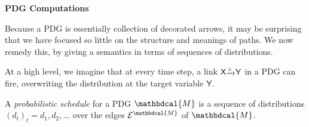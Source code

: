 \documentclass{article}
\theoremstyle{definition}
\theoremstyle{remark}
\newcommand{\Ed}{\mathcal E}
\newcommand{\ed}[3]{\var{#2}
	\overset{\smash{\mskip-5mu\raisebox{-3pt}{$\scriptscriptstyle
				#1$}}}{\raisebox{-1pt}{$\xrightarrow{\hphantom{\scriptscriptstyle#1}}$}} \var{#3}}
\newcommand{\dg}[1]{\mathbdcal{#1}}
\newcommand{\var}[1]{\mathsf{#1}}
\begin{document}
\begin{center}
  \textbf{ \Large PDG Computations} 
\end{center}


Because a PDG is essentially collection of decorated arrows, it may be surprising that we have focused so little on the structure and meanings of paths. We now remedy this, by giving a semantics in terms of sequences of distributions.

At a high level, we imagine that at every time step, a link $\ed LXY$ in a PDG can fire, overwriting the distribution at the target variable $\var Y$. 


\begin{defn}
	A \emph{probabilistic schedule} for a PDG $\dg M$ is a sequence of distributions $(d_t)_t =d_1, d_2, \ldots$ over the edges $\Ed^{\dg M}$ of $\dg M$.
\end{defn}



\end{document}
